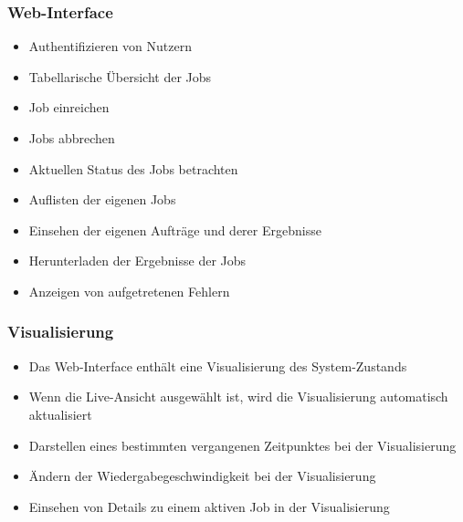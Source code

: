     \subsubsection{Web-Interface}
        \begin{itemize}[noitemsep]
            \item Authentifizieren von Nutzern
            \item Tabellarische Übersicht  der Jobs
            \item Job einreichen
            \item Jobs abbrechen
                    \item Aktuellen Status des Jobs betrachten
                    \item Auflisten der eigenen Jobs
            \item Einsehen der eigenen Aufträge und derer Ergebnisse
            \item Herunterladen der Ergebnisse der Jobs
            \item Anzeigen von aufgetretenen Fehlern
            
                      
        \end{itemize}
    \subsubsection{Visualisierung}    
        \begin{itemize}[noitemsep]
            \item Das Web-Interface enthält eine Visualisierung des System-Zustands
            \item Wenn die Live-Ansicht ausgewählt ist, wird die Visualisierung automatisch aktualisiert
            \item Darstellen eines bestimmten vergangenen Zeitpunktes bei der Visualisierung
            \item Ändern der Wiedergabegeschwindigkeit bei der Visualisierung
            \item Einsehen von Details zu einem aktiven Job in der Visualisierung
        \end{itemize}
    
